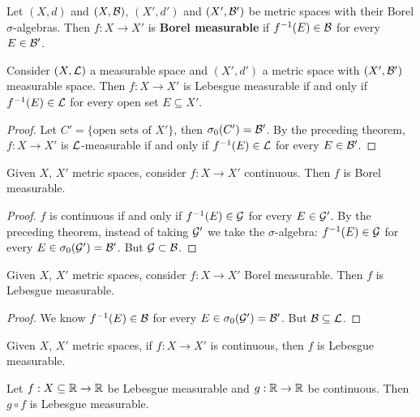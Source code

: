 \begin{definition}
Let $(X,d)$ and $(X,\mathcal{B})$, $(X',d')$ and $(X',\mathcal{B}')$ be metric spaces with their Borel $\sigma$-algebras.
Then $f:X \to X'$ is \textbf{Borel measurable} if $f^{-1}(E) \in \mathcal{B}$ for every $E \in \mathcal{B}'$.
\end{definition}

\begin{corollary}
Consider $(X,\mathcal{L})$ a measurable space and $(X',d')$ a metric space with $(X',\mathcal{B}')$ measurable space.
Then $f:X \to X'$ is Lebesgue measurable if and only if $f^{-1}(E) \in \mathcal{L}$ for every open set $E \subseteq X'$.
\end{corollary}

\begin{proof}
Let $C' = \{\text{open sets of } X'\}$, then $\sigma_0(C') = \mathcal{B}'$.
By the preceding theorem, $f:X \to X'$ is $\mathcal{L}$-measurable if and only if $f^{-1}(E) \in \mathcal{L}$ for every $E \in \mathcal{B}'$.
\end{proof}

\begin{corollary}
Given $X$, $X'$ metric spaces, consider $f:X \to X'$ continuous.
Then $f$ is Borel measurable.
\end{corollary}

\begin{proof}
$f$ is continuous if and only if $f^{-1}(E) \in \mathcal{G}$ for every $E \in \mathcal{G}'$.
By the preceding theorem, instead of taking $\mathcal{G}'$ we take the $\sigma$-algebra:
$f^{-1}(E) \in \mathcal{G}$ for every $E \in \sigma_0(\mathcal{G}') = \mathcal{B}'$.
But $\mathcal{G} \subset \mathcal{B}$.
\end{proof}

\clearpage
\begin{corollary}
Given $X$, $X'$ metric spaces, consider $f:X \to X'$ Borel measurable.
Then $f$ is Lebesgue measurable.
\end{corollary}

\begin{proof}
We know $f^{-1}(E) \in \mathcal{B}$ for every $E \in \sigma_0(\mathcal{G}') = \mathcal{B}'$.
But $\mathcal{B} \subseteq \mathcal{L}$.
\end{proof}

\begin{corollary}
Given $X$, $X'$ metric spaces, if $f:X \to X'$ is continuous, then $f$ is Lebesgue measurable.
\end{corollary}

\begin{theorem}
Let $f:X \subseteq \mathbb{R} \to \mathbb{R}$ be Lebesgue measurable and $g:\mathbb{R} \to \mathbb{R}$ be continuous.
Then $g \circ f$ is Lebesgue measurable.
\end{theorem}

